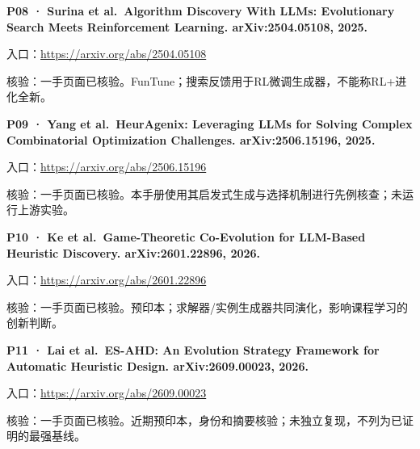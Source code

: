 \par\noindent\begin{minipage}{\linewidth}
\textbf{P08 · Surina et al.~Algorithm Discovery With LLMs: Evolutionary
Search Meets Reinforcement Learning. arXiv:\allowbreak{}2504.05108, 2025.}

入口：\url{https://arxiv.org/abs/2504.05108}

核验：一手页面已核验。FunTune；搜索反馈用于RL微调生成器，不能称RL+进化全新。
\end{minipage}\par\vspace{6pt}

\par\noindent\begin{minipage}{\linewidth}
\textbf{P09 · Yang et al.~HeurAgenix: Leveraging LLMs for Solving
Complex Combinatorial Optimization Challenges. arXiv:\allowbreak{}2506.15196, 2025.}

入口：\url{https://arxiv.org/abs/2506.15196}

核验：一手页面已核验。本手册使用其启发式生成与选择机制进行先例核查；未运行上游实验。
\end{minipage}\par\vspace{6pt}

\par\noindent\begin{minipage}{\linewidth}
\textbf{P10 · Ke et al.~Game-Theoretic Co-Evolution for LLM-Based
Heuristic Discovery. arXiv:\allowbreak{}2601.22896, 2026.}

入口：\url{https://arxiv.org/abs/2601.22896}

核验：一手页面已核验。预印本；求解器/实例生成器共同演化，影响课程学习的创新判断。
\end{minipage}\par\vspace{6pt}

\par\noindent\begin{minipage}{\linewidth}
\textbf{P11 · Lai et al.~ES-AHD: An Evolution Strategy Framework for
Automatic Heuristic Design. arXiv:\allowbreak{}2609.00023, 2026.}

入口：\url{https://arxiv.org/abs/2609.00023}

核验：一手页面已核验。近期预印本，身份和摘要核验；未独立复现，不列为已证明的最强基线。
\end{minipage}\par\vspace{6pt}


